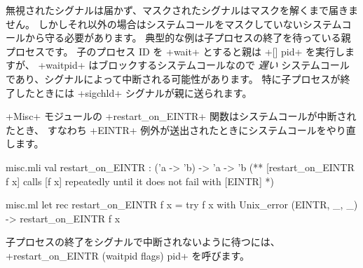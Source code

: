 無視されたシグナルは届かず、マスクされたシグナルはマスクを解くまで届きません。
しかしそれ以外の場合はシステムコールをマスクしていないシステムコールから守る必要があります。
典型的な例は子プロセスの終了を待っている親プロセスです。
子のプロセス ID を \ml+wait+ とすると親は  \ml+[] pid+ を実行しますが、
\ml+waitpid+ はブロックするシステムコールなので \emph{遅い} システムコールであり、シグナルによって中断される可能性があります。
特に子プロセスが終了したときには \ml+sigchld+ シグナルが親に送られます。

\ml+Misc+ モジュールの \ml+restart_on_EINTR+ 関数はシステムコールが中断されたとき、
すなわち \ml+EINTR+ 例外が送出されたときにシステムコールをやり直します。

%
\begin{codefile}{misc.mli}
val restart_on_EINTR : ('a -> 'b) -> 'a -> 'b
(** [restart_on_EINTR f x] calls [f x] repeatedly until it does not fail
with [EINTR] *)
\end{codefile}
%
\begin{listingcodefile}{misc.ml}
let rec restart_on_EINTR f x =
  try f x with Unix_error (EINTR, _, _) -> restart_on_EINTR f x
\end{listingcodefile}
子プロセスの終了をシグナルで中断されないように待つには、
\ml+restart_on_EINTR (waitpid flags) pid+ を呼びます。

